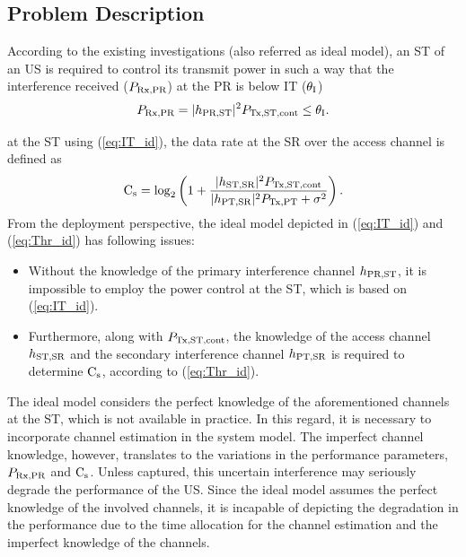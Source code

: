 
\subsection{Problem Description} \label{ssec:pd}
According to the existing investigations (also referred as ideal model), an ST of an US is required to control its transmit power in such a way that the interference received ($P_{\text{Rx,PR}}$) at the PR is below IT ($\theta_{\text{I}}$) \cite{Xing07}
\begin{equation}
\pp = \pgpo \preg \le \ite.
\label{eq:IT_id}
\end{equation}

 at the ST using (\ref{eq:IT_id}), the data rate at the SR over the access channel is defined as
\begin{equation}
\ca = \log_2 \left(1 + \frac{\pgs \preg}{ \pgpt \ptranpt + \nps} \right). 
\label{eq:Thr_id}
\end{equation}
From the deployment perspective, the ideal model depicted in (\ref{eq:IT_id}) and (\ref{eq:Thr_id}) has following issues:
\begin{itemize}
\item Without the knowledge of the primary interference channel $h_{\text{PR,ST}}$, it is impossible to employ the power control at the ST, which is based on (\ref{eq:IT_id}). 
\item Furthermore, along with $P_{\text{Tx,ST,cont}}$, the knowledge of the access channel $h_{\text{ST,SR}}$ and the secondary interference channel $h_{\text{PT,SR}}$ is required to determine $\text{C}_{\text{s}}$, according to (\ref{eq:Thr_id}).
\end{itemize}
The ideal model considers the perfect knowledge of the aforementioned channels at the ST, which is not available in practice. In this regard, it is necessary to incorporate channel estimation in the system model. The imperfect channel knowledge, however, translates to the variations in the performance parameters, $P_{\text{Rx,PR}}$ and $\text{C}_{\text{s}}$.  Unless captured, this uncertain interference may seriously degrade the performance of the US. Since the ideal model assumes the perfect knowledge of the involved channels, it is incapable of depicting the degradation in the performance due to the time allocation for the channel estimation and the imperfect knowledge of the channels. %

